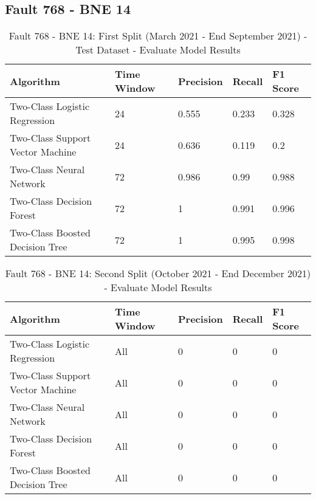 \subsection{Fault 768 - BNE 14}

\begin{table}[!ht]
    \centering
    \begin{tabular}{|l|l|l|l|l|}
    \hline
        Algorithm & Time Window & Precision & Recall & F1 Score \\ \hline
        Two-Class Logistic Regression & 24 & 0.555 & 0.233 & 0.328 \\ \hline
        Two-Class Support Vector Machine & 24 & 0.636 & 0.119 & 0.2 \\ \hline
        Two-Class Neural Network & 72 & 0.986 & 0.99 & 0.988 \\ \hline
        Two-Class Decision Forest & 72 & 1 & 0.991 & 0.996 \\ \hline
        Two-Class Boosted Decision Tree & 72 & 1 & 0.995 & 0.998 \\ \hline
    \end{tabular}
    \caption{Fault 768 - BNE 14: First Split (March 2021 - End September 2021) - Test Dataset - Evaluate Model Results}
    \label{9112_SCA34_1st}
\end{table}

\begin{table}[!ht]
    \centering
    \begin{tabular}{|l|l|l|l|l|}
    \hline
        Algorithm & Time Window & Precision & Recall & F1 Score \\ \hline
        Two-Class Logistic Regression & All & 0 & 0 & 0 \\ \hline
        Two-Class Support Vector Machine & All & 0 & 0 & 0 \\ \hline
        Two-Class Neural Network & All & 0 & 0 & 0 \\ \hline
        Two-Class Decision Forest & All & 0 & 0 & 0 \\ \hline
        Two-Class Boosted Decision Tree & All & 0 & 0 & 0 \\ \hline
    \end{tabular}
    \caption{Fault 768 - BNE 14: Second Split (October 2021 - End December 2021) - Evaluate Model Results}
    \label{9112_SCA34_1st}
\end{table}

